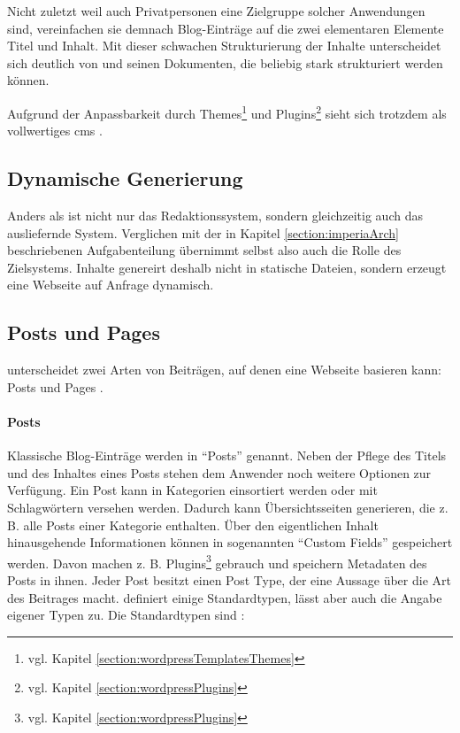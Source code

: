         Nicht zuletzt weil auch Privatpersonen eine Zielgruppe
        solcher Anwendungen sind, vereinfachen sie demnach Blog-Einträge
        auf die zwei elementaren Elemente Titel und Inhalt.
        Mit dieser schwachen Strukturierung der Inhalte
        unterscheidet sich {\wordpress} deutlich von {\imperia}
        und seinen Dokumenten, die beliebig stark strukturiert
        werden können.

        Aufgrund der Anpassbarkeit durch Themes\footnote{vgl. Kapitel \ref{section:wordpressTemplatesThemes}}
        und Plugins\footnote{vgl. Kapitel \ref{section:wordpressPlugins}} sieht sich
        {\wordpress} trotzdem als vollwertiges \gls{cms}
        \cite{wordpress:About}.

    \subsection{Dynamische Generierung}
        Anders als {\imperia} ist {\wordpress} nicht nur das Redaktionssystem,
        sondern gleichzeitig auch das ausliefernde System.
        Verglichen mit der in Kapitel \ref{section:imperiaArch}
        beschriebenen Aufgabenteilung übernimmt {\wordpress} selbst
        also auch die Rolle des Zielsystems.
        Inhalte genereirt {\wordpress} deshalb nicht in statische Dateien,
        sondern erzeugt eine Webseite auf Anfrage dynamisch.

    \subsection{Posts und Pages}
        \label{section:wordpressPostsPages}
        {\wordpress} unterscheidet zwei Arten von Beiträgen,
        auf denen eine Webseite basieren kann: Posts
        und Pages \cite{wordpress:Pages}.

        \paragraph*{Posts}
        Klassische Blog-Einträge werden in {\wordpress} "`Posts"' genannt.
        Neben der Pflege des Titels und des Inhaltes eines Posts stehen dem
        Anwender noch weitere Optionen zur Verfügung.
        Ein Post kann in Kategorien einsortiert werden oder mit Schlagwörtern versehen werden.
        Dadurch kann {\wordpress} Übersichtsseiten generieren,
        die z. B. alle Posts einer Kategorie enthalten.
        Über den eigentlichen Inhalt hinausgehende Informationen können
        in sogenannten "`Custom Fields"' gespeichert werden.
        Davon machen z. B. Plugins\footnote{vgl. Kapitel \ref{section:wordpressPlugins}} gebrauch
        und speichern Metadaten des Posts in ihnen.
        Jeder Post besitzt einen Post Type,
        der eine Aussage über die Art des Beitrages macht.
        {\wordpress} definiert einige Standardtypen,
        lässt aber auch die Angabe eigener Typen zu.
        Die Standardtypen sind
        \cite{wordpress:PostTypes}:

